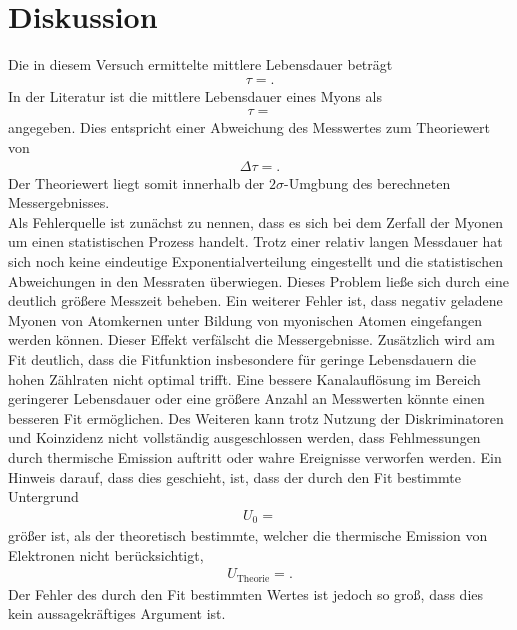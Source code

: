 \section{Diskussion}
\label{sec:Diskussion}

Die in diesem Versuch ermittelte mittlere Lebensdauer beträgt
\begin{align*}
  \tau = .
\end{align*}
In der Literatur \cite{Agashe:2014kda} ist die mittlere Lebensdauer eines Myons als
\begin{align*}
  \tau = 
\end{align*}
angegeben.
Dies entspricht einer Abweichung des Messwertes zum Theoriewert von
\begin{align*}
  \Delta \tau = .
\end{align*}
Der Theoriewert liegt somit innerhalb der $2\sigma$-Umgbung des berechneten Messergebnisses.\\
Als Fehlerquelle ist zunächst zu nennen, dass es sich bei dem Zerfall der Myonen um einen statistischen Prozess handelt.
Trotz einer relativ langen Messdauer hat sich noch keine eindeutige Exponentialverteilung eingestellt und die statistischen Abweichungen in den Messraten überwiegen.
Dieses Problem ließe sich durch eine deutlich größere Messzeit beheben.
Ein weiterer Fehler ist, dass negativ geladene Myonen von Atomkernen unter Bildung von myonischen Atomen eingefangen werden können.
Dieser Effekt verfälscht die Messergebnisse.
Zusätzlich wird am Fit deutlich, dass die Fitfunktion insbesondere für geringe Lebensdauern die hohen Zählraten nicht optimal trifft.
Eine bessere Kanalauflösung im Bereich geringerer Lebensdauer oder eine größere Anzahl an Messwerten könnte einen besseren Fit ermöglichen.
Des Weiteren kann trotz Nutzung der Diskriminatoren und Koinzidenz nicht vollständig ausgeschlossen werden, dass Fehlmessungen durch thermische Emission auftritt oder wahre Ereignisse verworfen werden.
Ein Hinweis darauf, dass dies geschieht, ist, dass der durch den Fit bestimmte Untergrund
\begin{align*}
  U_0 = 
\end{align*}
größer ist, als der theoretisch bestimmte, welcher die thermische Emission von Elektronen nicht berücksichtigt,
\begin{align*}
  U_{\text{Theorie}} = .
\end{align*}
Der Fehler des durch den Fit bestimmten Wertes ist jedoch so groß, dass dies kein aussagekräftiges Argument ist.
